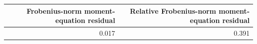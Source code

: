 \begin{tabular}{rr}
\toprule
Frobenius-norm moment-equation residual & Relative Frobenius-norm moment-equation residual \\
\midrule
0.017 & 0.391 \\
\bottomrule
\end{tabular}
